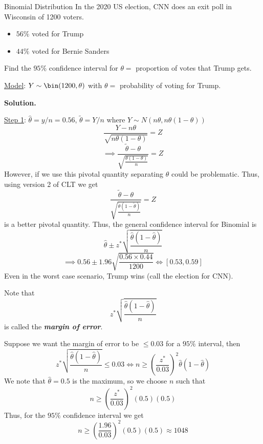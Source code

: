 \begin{Example}{Binomial Distribution}{}
    In the 2020 US election, CNN does an exit poll in Wisconsin of 1200 voters.
    \begin{itemize}
        \item $ 56\% $ voted for Trump
        \item $ 44\% $ voted for Bernie Sanders
    \end{itemize}
    Find the $ 95\% $ confidence interval for $ \theta= $ proportion of votes that
    Trump gets.

    \underline{Model}: $ Y \sim \bin(1200,\theta) $ with $ \theta= $ probability of
    voting for Trump.

    \textbf{Solution.}

    \underline{Step 1}: $ \hat{\theta}=y/n=0.56 $, $ \tilde{\theta}=Y/n $
    where $ Y \sim N(n\theta,n\theta(1-\theta)) $
    \[ \frac{Y-n\theta}{\sqrt{n\theta(1-\theta)}}=Z  \]
    \[ \implies \frac{\tilde{\theta}-\theta}{\sqrt{\frac{\theta(1-\theta)}{n}}}=Z  \]
    However, if we use this pivotal quantity separating $ \theta $ could be problematic.
    Thus, using version 2 of CLT we get
    \[ \frac{\tilde{\theta}-\theta}{\sqrt{\frac{\tilde{\theta}(1-\tilde{\theta})}{n}}}=Z \]
    is a better pivotal quantity.
    Thus, the general confidence interval for Binomial is
    \[ \hat{\theta}\pm z^*\sqrt{\frac{\hat{\theta}\left(1-\hat{\theta}\right)}{n} } \]
    \[ \implies 0.56\pm 1.96\sqrt{\frac{0.56\times 0.44}{1200}}\iff \left[ 0.53,0.59 \right] \]
    Even in the worst case scenario, Trump wins (call the election for CNN).

    Note that
    \[ z^*\sqrt{\frac{\hat{\theta}\left(1-\hat{\theta}\right)} {n}} \]
    is called the \textbf{\emph{margin of error}}.

    Suppose we want the margin of error to be $ \leqslant 0.03 $ for a $ 95\% $ interval, then
    \[ z^*\sqrt{\frac{\hat{\theta}\left(1-\hat{\theta}\right)}{n}}\leqslant 0.03\iff
        n\geqslant \left( \frac{z^*}{0.03}  \right)^2\hat{\theta}\left(1-\hat{\theta}\right) \]
    We note that $ \hat{\theta}=0.5 $ is the maximum, so we choose $ n $ such that
    \[ n\geqslant \left( \frac{z^*}{0.03}  \right)^2(0.5)(0.5) \]
    Thus, for the $ 95\% $ confidence interval we get
    \[ n\geqslant \left( \frac{1.96}{0.03} \right)^2(0.5)(0.5)\approx 1048 \]
\end{Example}

